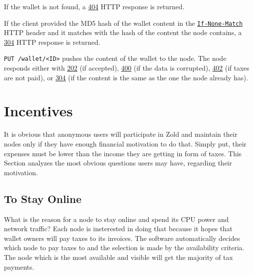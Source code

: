 \documentclass[11pt,oneside]{article}
\newcommand\dd[1]{\colorbox{gray!30}{\texttt{#1}}}
\begin{document}
If the wallet is not found, a
\href{https://www.w3.org/Protocols/rfc2616/rfc2616-sec10.html#sec10.4.5}{404}
HTTP response is returned.

If the client provided the MD5 hash of the wallet content in the
\href{https://www.w3.org/Protocols/rfc2616/rfc2616-sec14.html#sec14.26}{\dd{If-None-Match}}
HTTP header and it matches with the hash of the
content the node contains, a
\href{https://www.w3.org/Protocols/rfc2616/rfc2616-sec10.html#sec10.3.5}{304} HTTP response is returned.

\dd{PUT /wallet/<ID>} pushes the content of the wallet to the node. The
node responds either with
\href{https://www.w3.org/Protocols/rfc2616/rfc2616-sec10.html#sec10.2.3}{202} (if accepted),
\href{https://www.w3.org/Protocols/rfc2616/rfc2616-sec10.html#sec10.4.1}{400} (if the data is corrupted),
\href{https://www.w3.org/Protocols/rfc2616/rfc2616-sec10.html#sec10.4.3}{402} (if taxes are not paid),
or
\href{https://www.w3.org/Protocols/rfc2616/rfc2616-sec10.html#sec10.3.5}{304}
(if the content is the same as the one the node already has).

\section{Incentives}

It is obvious that anonymous users will participate in Zold and maintain
their nodes only if they have enough financial motivation to do that. Simply
put, their expenses must be lower than the income they are getting in
form of taxes. This Section analyzes the most obvious questions users
may have, regarding their motivation.

\subsection{To Stay Online}

What is the reason for a node to stay online and spend its CPU power
and network traffic? Each node is insterested in doing that because it
hopes that wallet owners will pay taxes to its invoices. The software
automatically decides which node to pay taxes to and the selection is
made by the availability criteria. The node which is the most available
and visible will get the majority of tax payments.
\end{document}
